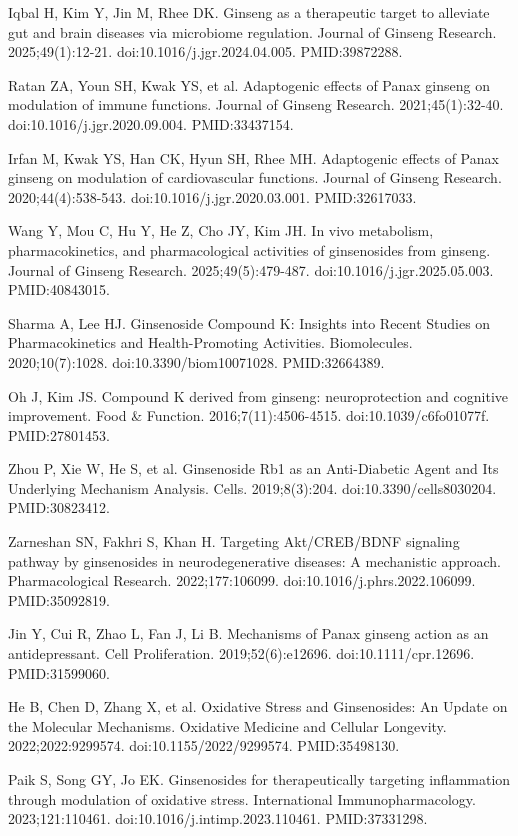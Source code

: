 \documentclass[12pt,oneside]{book}
\newcommand{\reff}[2]{\par\hangindent=7mm\hangafter=1\noindent[#1]\hspace{2mm}#2\par}
\begin{document}
\reff{4}{Iqbal H, Kim Y, Jin M, Rhee DK. Ginseng as a therapeutic target to alleviate gut and brain diseases via microbiome regulation. Journal of Ginseng Research. 2025;49(1):12-21. doi:10.1016/j.jgr.2024.04.005. PMID:39872288.}

\reff{5}{Ratan ZA, Youn SH, Kwak YS, et al. Adaptogenic effects of Panax ginseng on modulation of immune functions. Journal of Ginseng Research. 2021;45(1):32-40. doi:10.1016/j.jgr.2020.09.004. PMID:33437154.}

\reff{6}{Irfan M, Kwak YS, Han CK, Hyun SH, Rhee MH. Adaptogenic effects of Panax ginseng on modulation of cardiovascular functions. Journal of Ginseng Research. 2020;44(4):538-543. doi:10.1016/j.jgr.2020.03.001. PMID:32617033.}

\reff{7}{Wang Y, Mou C, Hu Y, He Z, Cho JY, Kim JH. In vivo metabolism, pharmacokinetics, and pharmacological activities of ginsenosides from ginseng. Journal of Ginseng Research. 2025;49(5):479-487. doi:10.1016/j.jgr.2025.05.003. PMID:40843015.}

\reff{8}{Sharma A, Lee HJ. Ginsenoside Compound K: Insights into Recent Studies on Pharmacokinetics and Health-Promoting Activities. Biomolecules. 2020;10(7):1028. doi:10.3390/biom10071028. PMID:32664389.}

\reff{9}{Oh J, Kim JS. Compound K derived from ginseng: neuroprotection and cognitive improvement. Food \& Function. 2016;7(11):4506-4515. doi:10.1039/c6fo01077f. PMID:27801453.}

\reff{10}{Zhou P, Xie W, He S, et al. Ginsenoside Rb1 as an Anti-Diabetic Agent and Its Underlying Mechanism Analysis. Cells. 2019;8(3):204. doi:10.3390/cells8030204. PMID:30823412.}

\reff{11}{Zarneshan SN, Fakhri S, Khan H. Targeting Akt/CREB/BDNF signaling pathway by ginsenosides in neurodegenerative diseases: A mechanistic approach. Pharmacological Research. 2022;177:106099. doi:10.1016/j.phrs.2022.106099. PMID:35092819.}

\reff{12}{Jin Y, Cui R, Zhao L, Fan J, Li B. Mechanisms of Panax ginseng action as an antidepressant. Cell Proliferation. 2019;52(6):e12696. doi:10.1111/cpr.12696. PMID:31599060.}

\reff{13}{He B, Chen D, Zhang X, et al. Oxidative Stress and Ginsenosides: An Update on the Molecular Mechanisms. Oxidative Medicine and Cellular Longevity. 2022;2022:9299574. doi:10.1155/2022/9299574. PMID:35498130.}

\reff{14}{Paik S, Song GY, Jo EK. Ginsenosides for therapeutically targeting inflammation through modulation of oxidative stress. International Immunopharmacology. 2023;121:110461. doi:10.1016/j.intimp.2023.110461. PMID:37331298.}
\end{document}
